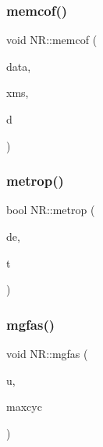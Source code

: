 \mbox{\label{namespaceNR_a160cae226a21c3be206ce06f63125499}} 
\subsubsection{\texorpdfstring{memcof()}{memcof()}}
{\footnotesize\ttfamily void N\+R\+::memcof (\begin{DoxyParamCaption}\item[{\mbox{\hyperlink{namespaceNR_a9f943da53862537c552e2a770cb170ae}{Vec\+\_\+\+I\+\_\+\+DP}} \&}]{data,  }\item[{\mbox{\hyperlink{namespaceNR_af6ff762dd605ff477b8e52387253a02a}{DP}} \&}]{xms,  }\item[{\mbox{\hyperlink{namespaceNR_a970094d23441f8ef6a45282a7eb2103d}{Vec\+\_\+\+O\+\_\+\+DP}} \&}]{d }\end{DoxyParamCaption})}

\mbox{\label{namespaceNR_ad1c330f016bd9cbd3564f4be1f09d5db}} 
\subsubsection{\texorpdfstring{metrop()}{metrop()}}
{\footnotesize\ttfamily bool N\+R\+::metrop (\begin{DoxyParamCaption}\item[{const \mbox{\hyperlink{namespaceNR_af6ff762dd605ff477b8e52387253a02a}{DP}}}]{de,  }\item[{const \mbox{\hyperlink{namespaceNR_af6ff762dd605ff477b8e52387253a02a}{DP}}}]{t }\end{DoxyParamCaption})}

\mbox{\label{namespaceNR_ae5a8be9b136a41fa270bef965c7560bd}} 
\subsubsection{\texorpdfstring{mgfas()}{mgfas()}}
{\footnotesize\ttfamily void N\+R\+::mgfas (\begin{DoxyParamCaption}\item[{\mbox{\hyperlink{namespaceNR_ad1513aa4697878ed3bff0b8b3c9dd910}{Mat\+\_\+\+I\+O\+\_\+\+DP}} \&}]{u,  }\item[{const int}]{maxcyc }\end{DoxyParamCaption})}

